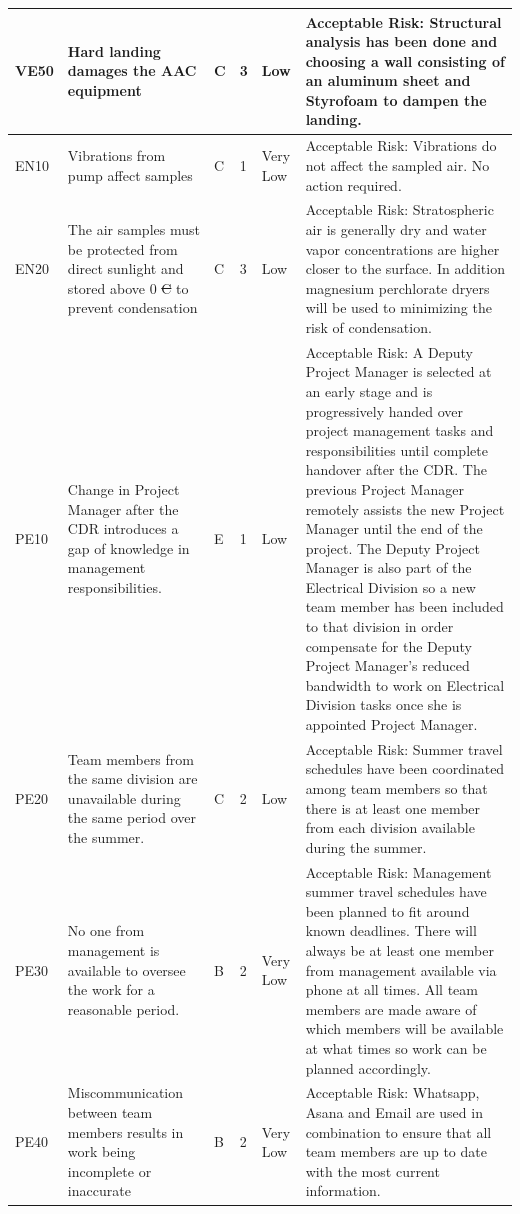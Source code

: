 \documentclass[a4paper,12pt,oneside]{article} %
\providecommand{\DIFaddtex}[1]{{\protect\color{blue}\uwave{#1}}} %
\providecommand{\DIFdeltex}[1]{{\protect\color{red}\sout{#1}}}                      %
\providecommand{\DIFaddbegin}{} %
\providecommand{\DIFaddend}{} %
\providecommand{\DIFdelbegin}{} %
\providecommand{\DIFdelend}{} %
\providecommand{\DIFadd}[1]{\texorpdfstring{\DIFaddtex{#1}}{#1}} %
\providecommand{\DIFdel}[1]{\texorpdfstring{\DIFdeltex{#1}}{}} %
\newcommand{\DIFscaledelfig}{0.5}
\newlength{\DIFdelgraphicswidth} %
\newlength{\DIFdelgraphicsheight} %
\newcommand{\DIFaddincludegraphics}[2][]{{\color{blue}\fbox{\DIFOincludegraphics[#1]{#2}}}} %
\newcommand{\DIFdelincludegraphics}[2][]{%
\sbox{\DIFdelgraphicsbox}{\DIFOincludegraphics[#1]{#2}}%
\settoboxwidth{\DIFdelgraphicswidth}{\DIFdelgraphicsbox} %
\settoboxtotalheight{\DIFdelgraphicsheight}{\DIFdelgraphicsbox} %
\scalebox{\DIFscaledelfig}{%
\parbox[b]{\DIFdelgraphicswidth}{\usebox{\DIFdelgraphicsbox}\\[-\baselineskip] \rule{\DIFdelgraphicswidth}{0em}}\llap{\resizebox{\DIFdelgraphicswidth}{\DIFdelgraphicsheight}{%
\setlength{\unitlength}{\DIFdelgraphicswidth}%
\begin{picture}(1,1)%
\thicklines\linethickness{2pt} %
{\color[rgb]{1,0,0}\put(0,0){\framebox(1,1){}}}%
{\color[rgb]{1,0,0}\put(0,0){\line( 1,1){1}}}%
{\color[rgb]{1,0,0}\put(0,1){\line(1,-1){1}}}%
\end{picture}%
}\hspace*{3pt}}} %
} %
\DeclareRobustCommand{\DIFaddbegin}{\DIFOaddbegin \let\includegraphics\DIFaddincludegraphics} %
\DeclareRobustCommand{\DIFaddend}{\DIFOaddend \let\includegraphics\DIFOincludegraphics} %
\DeclareRobustCommand{\DIFdelbegin}{\DIFOdelbegin \let\includegraphics\DIFdelincludegraphics} %
\DeclareRobustCommand{\DIFdelend}{\DIFOaddend \let\includegraphics\DIFOincludegraphics} %
\begin{document}
\begin{landscape}
\begin{longtable}{|m{}| m{} |m{} |m{}|m{}| m{}|}
VE50 & Hard landing damages the AAC equipment & C & 3 & \cellcolor[HTML]{FCFF2F}Low & Acceptable Risk:  Structural analysis has been done and choosing a wall consisting of an aluminum sheet and Styrofoam to dampen the landing. \\ \hline
EN10 & Vibrations from pump affect samples & C & 1 & \cellcolor[HTML]{34FF34}Very Low & Acceptable Risk: Vibrations do not affect the sampled air. No action required. \\ \hline
EN20 & The air samples must be protected from direct sunlight and stored above 0\DIFdelbegin %
\DIFdel{C }\DIFdelend \DIFaddbegin \DIFadd{\mbox{%
$\degree{C}$
}%
}\DIFaddend to prevent condensation & C & 3 & \cellcolor[HTML]{FCFF2F}Low & Acceptable Risk: Stratospheric air is generally dry and water vapor concentrations are higher closer to the surface. In addition magnesium perchlorate dryers will be used to minimizing the risk of condensation.    \\ \hline 
PE10 & Change in Project Manager after the CDR introduces a gap of knowledge in management responsibilities. & E & 1 & \cellcolor[HTML]{FCFF2F}Low & Acceptable Risk: A Deputy Project Manager is selected at an early stage and is progressively handed over project management tasks and responsibilities until complete handover after the CDR. The previous Project Manager remotely assists the new Project Manager until the end of the project. The Deputy Project Manager is also part of the Electrical Division so a new team member has been included to that division in order compensate for the Deputy Project Manager's reduced bandwidth to work on Electrical Division tasks once she is appointed Project Manager.\\ \hline 
PE20 & Team members from the same division are unavailable during the same period over the summer. & C & 2 & \cellcolor[HTML]{FCFF2F}Low & Acceptable Risk: Summer travel schedules have been coordinated among team members so that there is at least one member from each division available during the summer. \\ \hline
PE30 & No one from management is available to oversee the work for a reasonable period. & B & 2 & \cellcolor[HTML]{34FF34}Very Low & Acceptable Risk: Management summer travel schedules have been planned to fit around known deadlines. There will always be at least one member from management available via phone at all times. All team members are made aware of which members will be available at what times so work can be planned accordingly. \\ \hline
PE40 & Miscommunication between team members results in work being incomplete or inaccurate & B & 2 & \cellcolor[HTML]{34FF34}Very Low & Acceptable Risk: Whatsapp, Asana and Email are used in combination to ensure that all team members are up to date with the most current information. \\ \hline


\end{longtable}
\end{landscape}
\end{document}
